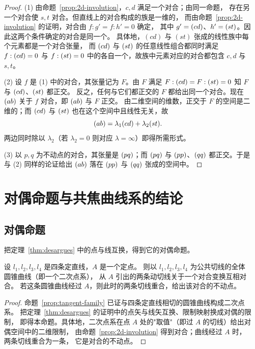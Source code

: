 \begin{proof}
(1) 由命题~\ref{prop:2d-involution}，$c,d$ 满足一个对合；由同一命题，
存在另一个对合使 $s,t$ 对合。但直线上的对合构成的族是一维的，
而由命题~\ref{prop:2d-involution} 的证明，对合由 $f:g'=f:h'=0$ 确定，
其中 $g'=(cd)$、$h'=(st)$。因此这两个条件确定的对合是同一个。
具体地，$(cd)$ 与 $(st)$ 张成的线性族中每个元素都是一个对合张量，
而 $(cd)$ 与 $(st)$ 的任意线性组合都同时满足
$f:(cd)=0$ 与 $f:(st)=0$ 中的各自一个，故族中元素对应的对合都包含 $c,d$ 与 $s,t$。

(2) 设 $f$ 是 (1) 中的对合，其张量记为 $F$。由 $F$ 满足
$F:(cd)=F:(st)=0$ 知 $F$ 与 $(cd)$、$(st)$ 都正交。
反之，任何与它们都正交的 $F$ 都给出同一个对合。现在
$(ab)$ 关于 $f$ 对合，即 $(ab)$ 与 $F$ 正交。
由二维空间的维数，正交于 $F$ 的空间是二维的；而 $(cd)$ 与 $(st)$
也在这个空间中且线性无关，故
\[
(ab)=\lambda_1(cd)+\lambda_2(st).
\]
两边同时除以 $\lambda_2$（若 $\lambda_2=0$ 则对应 $\lambda=\infty$）即得所需形式。

(3) 以 $p,q$ 为不动点的对合，其张量是 $(pq)$；而 $(pq)$ 与 $(pp)$、$(qq)$
都正交。于是与 (2) 同样的论证给出 $(ab)$ 落在 $(pp)$ 与 $(qq)$ 张成的空间中。
\end{proof}

\section{对偶命题与共焦曲线系的结论}

\subsection{对偶命题}

把定理~\ref{thm:desargues} 中的点与线互换，得到它的对偶命题。

\begin{proposition}[对偶命题]\label{prop:dual-desargues}
设 $l_1,l_2,l_3,l_4$ 是四条定直线，$A$ 是一个定点。
则以 $l_1,l_2,l_3,l_4$ 为公共切线的全体圆锥曲线（即一个二次点系），
从 $A$ 引出的两条动切线关于一个对合变换互相对合。
若这条圆锥曲线经过 $A$，则此时的两条切线重合，给出该对合的不动点。
\end{proposition}

\begin{proof}
命题~\ref{prop:tangent-family} 已证与四条定直线相切的圆锥曲线构成二次点系。
把定理~\ref{thm:desargues} 的证明中的点矢与线矢互换、限制映射换成对偶的限制，
即得本命题。具体地，二次点系在点 $A$ 处的"取值"（即过 $A$ 的切线）给出对偶空间中的二维限制，
由命题~\ref{prop:2d-involution} 得到对合；曲线经过 $A$ 时，两条切线重合为一条，
它是对合的不动点。
\end{proof}

